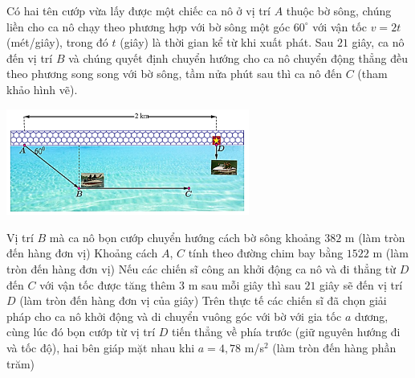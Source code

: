 \begin{ex}%
Có hai tên cướp vừa lấy được một chiếc ca nô ở vị trí $A$ thuộc bờ sông, chúng liền cho ca nô chạy theo phương hợp với bờ sông một góc $60^\circ$ với vận tốc $v=2t$ (mét/giây), trong đó $t$ (giây) là thời gian kể từ khi xuất phát. Sau $21$ giây, ca nô đến vị trí $B$ và chúng quyết định chuyển hướng cho ca nô chuyển động thẳng đều theo phương song song với bờ sông, tầm nửa phút sau thì ca nô đến $C$ (tham khảo hình vẽ).\\
\centerline{
    \includegraphics[width=8cm]{img/HXN-9-14}
}
    \choiceTF
    {\True Vị trí $B$ mà ca nô bọn cướp chuyển hướng cách bờ sông khoảng $382$ m (làm tròn đến hàng đơn vị)}
    {Khoảng cách $A$, $C$ tính theo đường chim bay bằng $1522$ m (làm tròn đến hàng đơn vị)}
    {\True Nếu các chiến sĩ công an khởi động ca nô và đi thẳng từ $D$ đến $C$ với vận tốc được tăng thêm $3$ m sau mỗi giây thì sau $21$ giây sẽ đến vị trí $D$ (làm tròn đến hàng đơn vị của giây)}
    {Trên thực tế các chiến sĩ đã chọn giải pháp cho ca nô khởi động và di chuyển vuông góc với bờ với gia tốc $a$ dương, cùng lúc đó bọn cướp từ vị trí $D$ tiến thẳng về phía trước (giữ nguyên hướng đi và tốc độ), hai bên giáp mặt nhau khi $a=4{,}78$ m/s$^2$ (làm tròn đến hàng phần trăm)}
\end{ex}
